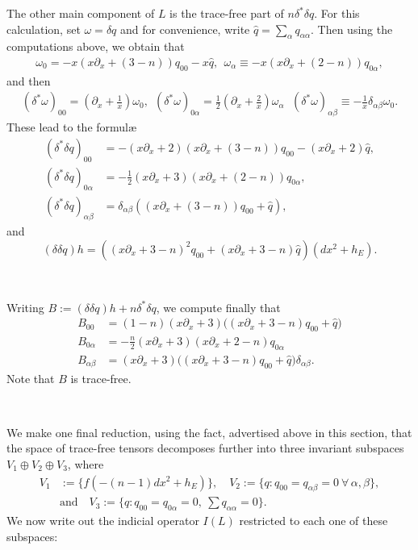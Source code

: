 \documentclass[10pt,reqno]{amsart}
\newcommand{\del}{\partial}
\begin{document}
The other main component of $L$ is the trace-free part of $n \delta^* \delta q$.  For this calculation, set $\omega = \delta q$ and for convenience,
write $\hat{q} = \sum_\alpha q_{\alpha \alpha}$. Then using the computations above, we obtain that
\begin{align*}
\omega_0  = - x (x\del_x + (3-n)) q_{00} - x \hat{q}, \ \ \omega_\alpha \equiv - x (x\del_x + (2-n)) q_{0 \alpha},
\end{align*}
and then
\begin{align*}
(\delta^* \omega)_{00} = (\del_x + \frac{1}{x}) \omega_0, \ \ (\delta^* \omega)_{0\alpha} = \frac12 (\del_x + \frac{2}{x}) \omega_\alpha \,  \ \ 
(\delta^* \omega)_{\alpha \beta} \equiv  -\frac{1}{x} \delta_{\alpha \beta} \omega_0.
\end{align*}
These lead to the formul\ae
\begin{align*}
(\delta^* \delta q)_{00} & = - (x\del_x + 2)(x\del_x + (3-n)) q_{00} - (x\del_x + 2) \hat{q} , \\
( \delta^* \delta q)_{0 \alpha} & = - \frac12 (x\del_x + 3) (x\del_x + (2-n)) q_{0\alpha}, \\
(\delta^* \delta q)_{\alpha \beta} & =  \delta_{\alpha \beta} \left( ( x\del_x + (3-n)) q_{00} + \hat{q}\right),
\end{align*}
and
\[
(\delta \delta q) h = \left( (x\del_x + 3-n)^2 q_{00} + (x\del_x + 3-n) \hat{q}\right) (dx^2 + h_E).
\]

\

Writing $B := (\delta \delta q) h + n \delta^* \delta q$, we compute finally that
\begin{align*}
B_{00} & = (1-n) (x\del_x  + 3) \big( (x\del_x + 3-n) q_{00} + \hat{q}\big) \\
B_{0\alpha} & = -\frac{n}{2} (x\del_x + 3)(x\del_x + 2-n) q_{0\alpha} \\ 
B_{\alpha \beta} & = (x\del_x + 3)\big( (x\del_x + 3-n) q_{00}  + \hat{q}\big) \delta_{\alpha \beta}.
 \end{align*}
Note that $B$ is trace-free. 

\ 

We make one final reduction, using the fact, advertised above in this section, that the space of trace-free tensors decomposes further 
into three invariant subspaces $V_1 \oplus V_2 \oplus V_3$, where
\begin{align*}
V_1 & := \{ f ( - (n-1)dx^2 + h_E) \}, \quad V_2 := \{ q: q_{00} = q_{\alpha \beta} = 0\ \forall\, \alpha, \beta\}, \\
& \mbox{and} \quad V_3:= \{ q: q_{00} = q_{0\alpha} = 0,\ \sum q_{\alpha \alpha} = 0\}.
\end{align*}
We now write out the indicial operator $I(L)$ restricted to each one of these subspaces: 
\end{document}
